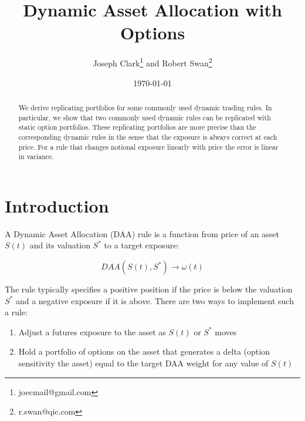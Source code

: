 \documentclass[12pt]{article}
\begin{document}
\begin{titlepage}
\title{Dynamic Asset Allocation with Options}
\author{Joseph Clark\thanks{joecmail@gmail.com}  and Robert Swan\thanks{r.swan@qic.com} }
\date{\today}
\maketitle
\begin{abstract}
\noindent We derive replicating portfolios for some commonly used dynamic trading rules. In particular, we show that two commonly used dynamic rules can be replicated with static option portfolios. These replicating portfolios are more precise than the corresponding dynamic rules in the sense that the exposure is always correct at each price. For a rule that changes notional exposure linearly with price the error is linear in variance. 



\bigskip
\end{abstract}
\setcounter{page}{0}
\thispagestyle{empty}
\end{titlepage}
\pagebreak \newpage




\doublespacing


\section{Introduction} \label{sec:introduction}

A Dynamic Asset Allocation (DAA) rule is a function from price of an asset $S(t)$ and its valuation $S^*$ to a target exposure:

\[DAA(S(t), S^*) \rightarrow \omega(t) \]

The rule typically specifies a positive position if the price is below the valuation $S^*$ and a negative exposure if it is above. There are two ways to implement such a rule:

\begin{enumerate}
\item Adjust a futures exposure to the asset as $S(t)$ or $S^*$ moves
\item Hold a portfolio of options on the asset that generates a delta (option sensitivity the asset) equal to the target DAA weight for any value of $S(t)$
\end{enumerate}
\end{document}
